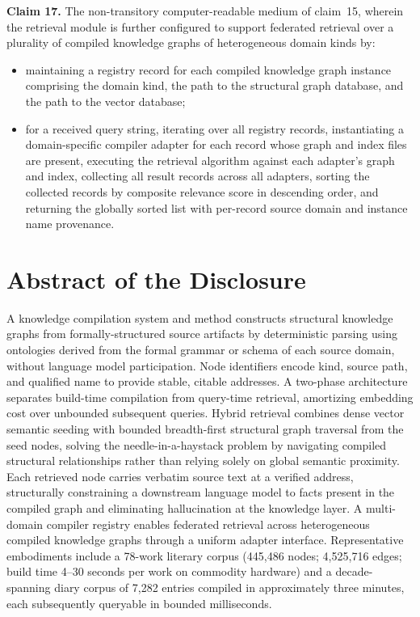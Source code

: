 \documentclass[12pt]{article}
\begin{document}
\bigskip
\noindent\textbf{Claim 17.}\quad
The non-transitory computer-readable medium of claim~15, wherein the retrieval
module is further configured to support federated retrieval over a plurality of
compiled knowledge graphs of heterogeneous domain kinds by:
\begin{itemize}[leftmargin=2.5em]
  \item maintaining a registry record for each compiled knowledge graph instance
    comprising the domain kind, the path to the structural graph database, and
    the path to the vector database;
  \item for a received query string, iterating over all registry records,
    instantiating a domain-specific compiler adapter for each record whose graph
    and index files are present, executing the retrieval algorithm against each
    adapter's graph and index, collecting all result records across all adapters,
    sorting the collected records by composite relevance score in descending
    order, and returning the globally sorted list with per-record source domain
    and instance name provenance.
\end{itemize}

\newpage
\section*{Abstract of the Disclosure}

A knowledge compilation system and method constructs structural knowledge graphs
from formally-structured source artifacts by deterministic parsing using
ontologies derived from the formal grammar or schema of each source domain,
without language model participation. Node identifiers encode kind, source path,
and qualified name to provide stable, citable addresses. A two-phase architecture
separates build-time compilation from query-time retrieval, amortizing embedding
cost over unbounded subsequent queries. Hybrid retrieval combines dense vector
semantic seeding with bounded breadth-first structural graph traversal from the
seed nodes, solving the needle-in-a-haystack problem by navigating compiled
structural relationships rather than relying solely on global semantic proximity.
Each retrieved node carries verbatim source text at a verified address,
structurally constraining a downstream language model to facts present in the
compiled graph and eliminating hallucination at the knowledge layer. A
multi-domain compiler registry enables federated retrieval across heterogeneous
compiled knowledge graphs through a uniform adapter interface. Representative
embodiments include a 78-work literary corpus (445,486 nodes; 4,525,716 edges;
build time 4--30 seconds per work on commodity hardware) and a decade-spanning
diary corpus of 7,282 entries compiled in approximately three minutes, each
subsequently queryable in bounded milliseconds.

\newpage


\end{document}
